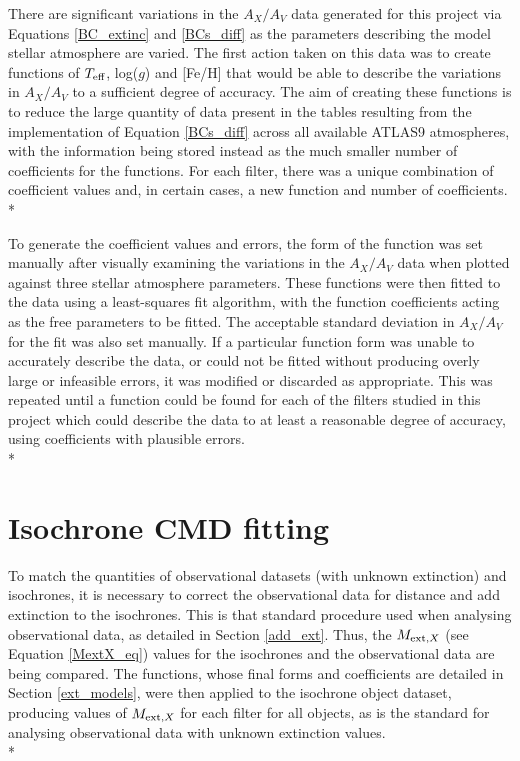 \documentclass[12pt, a4paper]{report}
\begin{document}
There are significant variations in the $A_{X}/A_{V}$ data generated for this project via Equations \ref{BC_extinc} and \ref{BCs_diff} as the parameters describing the model stellar atmosphere are varied. The first action taken on this data was to create functions of $T_{\textnormal{eff}}$, log($g$) and [Fe/H] that would be able to describe the variations in $A_{X}/A_{V}$ to a sufficient degree of accuracy. The aim of creating these functions is to reduce the large quantity of data present in the tables resulting from the implementation of Equation \ref{BCs_diff} across all available ATLAS9 atmospheres, with the information being stored instead as the much smaller number of coefficients for the functions. For each filter, there was a unique combination of coefficient values and, in certain cases, a new function and number of coefficients.\\*

To generate the coefficient values and errors, the form of the function was set manually after visually examining the variations in the $A_{X}/A_{V}$ data when plotted against three stellar atmosphere parameters. These functions were then fitted to the data using a least-squares fit algorithm, with the function coefficients acting as the free parameters to be fitted. The acceptable standard deviation in $A_{X}/A_{V}$ for the fit was also set manually. If a particular function form was unable to accurately describe the data, or could not be fitted without producing overly large or infeasible errors, it was modified or discarded as appropriate. This was repeated until a function could be found for each of the filters studied in this project which could  describe the data to at least a reasonable degree of accuracy, using coefficients with plausible errors.\\*

\section{Isochrone CMD fitting} \label{isoc_fit} 

To match the quantities of observational datasets (with unknown extinction) and isochrones, it is necessary to correct the observational data for distance and add extinction to the isochrones. This is that standard procedure used when analysing observational data, as detailed in Section \ref{add_ext}. Thus, the $M_{\textnormal{ext},X}$ (see Equation \ref{MextX_eq}) values for the isochrones and the observational data are being compared. The functions, whose final forms and coefficients are detailed in Section \ref{ext_models}, were then applied to the isochrone object dataset, producing values of $M_{\textnormal{ext},X}$ for each filter for all objects, as is the standard for analysing observational data with unknown extinction values. \\*
\end{document}
